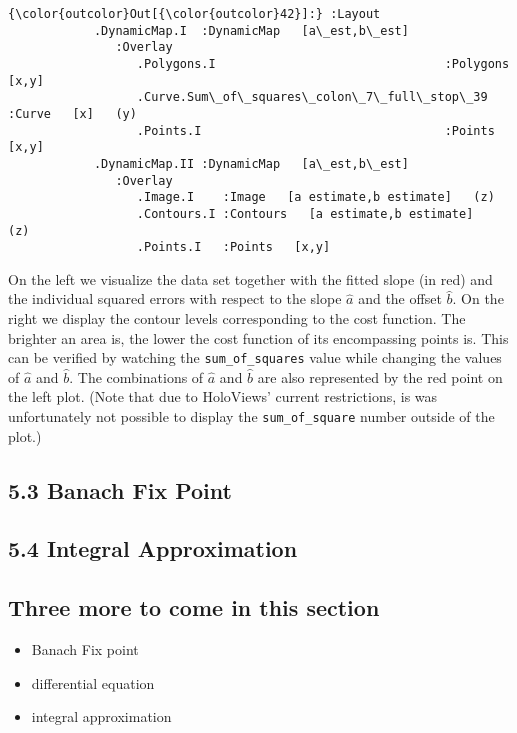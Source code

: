 \documentclass[11pt]{article}
\providecommand{\tightlist}{%
      \setlength{\itemsep}{0pt}\setlength{\parskip}{0pt}}
\begin{document}
\begin{Verbatim}[commandchars=\\\{\}]
{\color{outcolor}Out[{\color{outcolor}42}]:} :Layout
            .DynamicMap.I  :DynamicMap   [a\_est,b\_est]
               :Overlay
                  .Polygons.I                                :Polygons   [x,y]
                  .Curve.Sum\_of\_squares\_colon\_7\_full\_stop\_39 :Curve   [x]   (y)
                  .Points.I                                  :Points   [x,y]
            .DynamicMap.II :DynamicMap   [a\_est,b\_est]
               :Overlay
                  .Image.I    :Image   [a estimate,b estimate]   (z)
                  .Contours.I :Contours   [a estimate,b estimate]   (z)
                  .Points.I   :Points   [x,y]
\end{Verbatim}
            
    On the left we visualize the data set together with the fitted slope (in
red) and the individual squared errors with respect to the slope
\(\hat{a}\) and the offset \(\hat{b}\). On the right we display the
contour levels corresponding to the cost function. The brighter an area
is, the lower the cost function of its encompassing points is. This can
be verified by watching the \texttt{sum\_of\_squares} value while
changing the values of \(\hat{a}\) and \(\hat{b}\). The combinations of
\(\hat{a}\) and \(\hat{b}\) are also represented by the red point on the
left plot. (Note that due to HoloViews' current restrictions, is was
unfortunately not possible to display the \texttt{sum\_of\_square}
number outside of the plot.)

    \subsection{5.3 Banach Fix Point}\label{banach-fix-point}

    \subsection{5.4 Integral Approximation}\label{integral-approximation}

    \subsection{Three more to come in this
section}\label{three-more-to-come-in-this-section}

\begin{itemize}
\tightlist
\item
  Banach Fix point
\item
  differential equation
\item
  integral approximation
\end{itemize}
\end{document}
